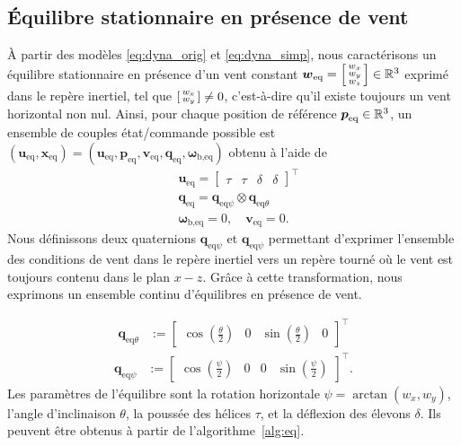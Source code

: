     \subsection{Équilibre stationnaire en présence de vent}
    \label{sec:eq_vent}
    À partir des modèles \eqref{eq:dyna_orig} et \eqref{eq:dyna_simp}, nous caractérisons un équilibre stationnaire en présence d'un vent constant $\boldsymbol{w}_{\mathrm{eq}} =\left[ \begin{smallmatrix}w_x \\ w_y \\w_z \end{smallmatrix} \right] \in {\mathbb R}^3$ exprimé dans le repère inertiel, tel que $\left[ \begin{smallmatrix}w_x \\ w_y \end{smallmatrix} \right] \neq 0$, c'est-à-dire qu'il existe toujours un vent horizontal non nul.
    Ainsi, pour chaque position de référence $\boldsymbol{p}_{\text{eq}} \in {\mathbb R}^3$, un ensemble de couples état/commande possible est $(\boldsymbol{u}_{\text{eq}}, \boldsymbol{x}_{\text{eq}}) = (\boldsymbol{u}_{\text{eq}}, \boldsymbol{p}_{\text{eq}}, \boldsymbol{v}_{\text{eq}}, \boldsymbol{q}_{\text{eq}}, \boldsymbol{\omega}_{\text{b},\text{eq}})$
    obtenu à l'aide de
    \begin{subequations}
    \label{eq:equilibrium}
    \begin{align}
    \label{eq:ueq}
            &\boldsymbol{u}_{\text{eq}} = \begin{bmatrix} \tau & \tau & \delta & \delta \end{bmatrix}^\top\\
            & \boldsymbol{q}_{\text{eq}} = \boldsymbol{q}_{\mathrm{eq}\psi} \otimes  \boldsymbol{q}_{\mathrm{eq}\theta} \label{eq:qeq}\\
            &\boldsymbol{\omega}_{\text{b},\text{eq}} = 0 , \quad \boldsymbol{v}_{\text{eq}} = 0.
    \end{align}
    \end{subequations}
    Nous définissons deux quaternions $\boldsymbol{q}_{\mathrm{eq}\psi}$ et $\boldsymbol{q}_{\mathrm{eq}\psi}$ permettant d'exprimer l'ensemble des conditions de vent dans le repère inertiel vers un repère tourné où le vent est toujours contenu dans le plan $x-z$. Grâce à cette transformation, nous exprimons un ensemble continu d'équilibres en présence de vent. 

    \begin{align}
    \label{eq:qtheta}
        \boldsymbol{q}_{\mathrm{eq}\theta} &:= \begin{bmatrix} \cos(\frac{\theta}{2}) & 0 & \sin(\frac{\theta}{2}) & 0 \end{bmatrix}^\top
    \end{align}
    \begin{align}
    \label{eq:qpsi}
        \boldsymbol{q}_{\mathrm{eq}\psi} &:= \begin{bmatrix} \cos(\frac{\psi}{2}) & 0 & 0 & \sin(\frac{\psi}{2}) \end{bmatrix}^\top.
    \end{align}
    Les paramètres de l'équilibre sont la rotation horizontale $\psi = \arctan(w_{x}, w_{y})$, l'angle d'inclinaison $\theta$, la poussée des hélices $\tau$, et la déflexion des élevons $\delta$. Ils peuvent être obtenus à partir de l'algorithme~\ref{alg:eq}. 

